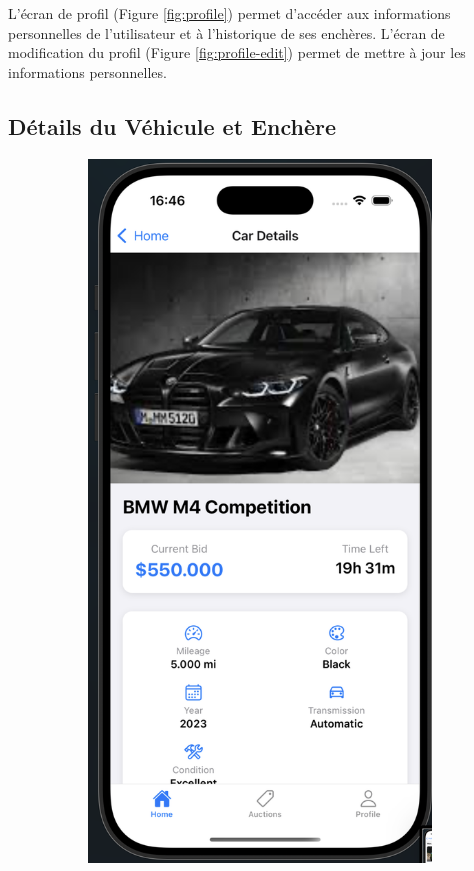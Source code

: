 L'écran de profil (Figure \ref{fig:profile}) permet d'accéder aux informations personnelles de l'utilisateur et à l'historique de ses enchères. L'écran de modification du profil (Figure \ref{fig:profile-edit}) permet de mettre à jour les informations personnelles.

\subsection{Détails du Véhicule et Enchère}

\begin{figure}[H]
    \centering
    \begin{subfigure}[b]{0.48\textwidth}
        \includegraphics[width=\textwidth]{images/auction details 1 .png}

\end{subfigure}
\end{figure}
